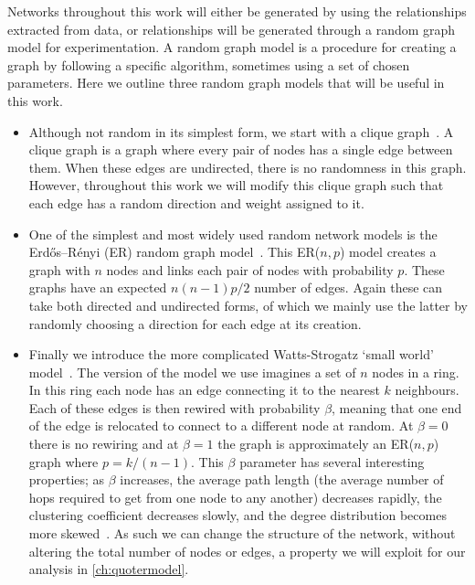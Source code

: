 Networks throughout this work will either be generated by using the relationships extracted from data, or relationships will be generated through a random graph model for experimentation. A random graph model is a procedure for creating a graph by following a specific algorithm, sometimes using a set of chosen parameters.  Here we outline three random graph models that will be useful in this work.

\begin{itemize}
	\item Although not random in its simplest form, we start with a clique graph~\cite{newman_networks_2018}. A clique graph is a graph where every pair of nodes has a single edge between them. When these edges are undirected, there is no randomness in this graph. However, throughout this work we will modify this clique graph such that each edge has a random direction and weight assigned to it. 
	\item One of the simplest and most widely used random network models is the Erdős–Rényi (ER) random graph model~\cite{erdos_evolution_1960,gilbert_random_1959}. This ER($n,p$) model creates a graph with $n$ nodes and links each pair of nodes with probability $p$. These graphs have an expected $n(n-1)p/2$ number of edges. Again these can take both directed and undirected forms, of which we mainly use the latter by randomly choosing a direction for each edge at its creation.
	\item Finally we introduce the more complicated Watts-Strogatz `small world' model~\cite{watts_collective_1998}. The version of the model we use imagines a set of $n$ nodes in a ring. In this ring each node has an edge connecting it to the nearest $k$ neighbours. Each of these edges is then rewired with probability $\beta$, meaning that one end of the edge is relocated to connect to a different node at random. At $\beta=0$ there is no rewiring and at $\beta=1$ the graph is approximately an ER($n,p$) graph where $p=k/(n-1)$. This $\beta$ parameter has several interesting properties; as $\beta$ increases, the average path length (the average number of hops required to get from one node to any another) decreases rapidly, the clustering coefficient decreases slowly, and the degree distribution becomes more skewed~\cite{watts_collective_1998}. As such we can change the structure of the network, without altering the total number of nodes or edges, a property we will exploit for our analysis in \autoref{ch:quotermodel}.
\end{itemize}

